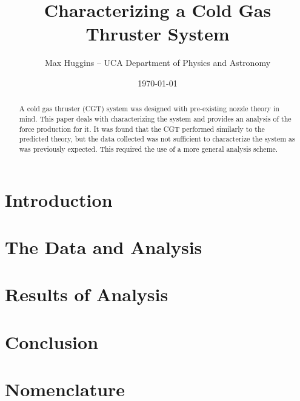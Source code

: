 \documentclass[letterpaper,12pt]{article}
\begin{document}
\title{Characterizing a Cold Gas Thruster System}
\author{Max Huggins – UCA Department of Physics and Astronomy}
\date{\today}
\maketitle


\begin{abstract}
A cold gas thruster (CGT) system was designed with pre-existing nozzle theory in mind. This paper deals with characterizing the system and provides an analysis of the force production for it. It was found that the CGT performed similarly to the predicted theory, but the data collected was not sufficient to characterize the system as was previously expected. This required the use of a more general analysis scheme.
\end{abstract}


\section{Introduction}


\section{The Data and Analysis}




\section{Results of Analysis}




\section{Conclusion}




\section{Nomenclature}\label{nomenclature}




\end{document}
